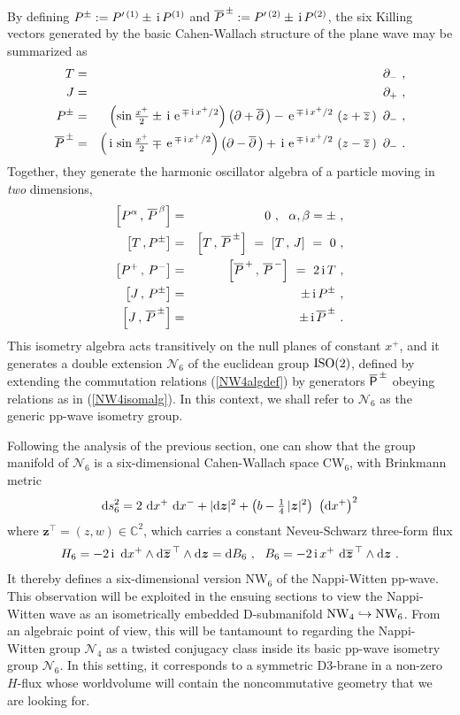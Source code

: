 \documentclass[11pt,a4paper]{article}
\newcommand{\ii}{{\rm i}}
\newcommand{\mbf}[1]{{\boldsymbol {#1} }}
\def\ii{{\,{\rm i}\,}}
\def\dd{{\rm d}}
\def\P{{\sf P}}
\def\J{{\sf J}}
\def\mz{{\mbf z}}
\newcommand{\complex}{{\mathbb C}} %
\def\nn{\nonumber}
\def\e{{\,\rm e}\,}
\def\bea{\begin{eqnarray}}
\def\eea{\end{eqnarray}}
\newcommand{\beq}{\begin{eqnarray}}
\newcommand{\eeq}{\end{eqnarray}}
\begin{document}
By defining $P^\pm:=P^{\prime\,(1)}\pm\ii P^{(1)}$ and
$\overline{P}^{\,\pm}:=P^{\prime\,(2)}\pm\ii P^{(2)}$, the six
Killing vectors generated by the basic Cahen-Wallach structure of the
plane wave may be summarized as
\bea
T&=&\partial_- \ , \nn\\J&=&\partial_+ \ , \nn\\
P^\pm&=&\left(\sin\mbox{$\frac{x^+}2$}\pm\ii\e^{\mp\ii x^+/2}\right)
\left(\partial+\overline{\partial}\,\right)-\e^{\mp\ii x^+/2}\,\left(
z+\overline{z}\,\right)~\partial_- \ , \nn
\\\overline{P}^{\,\pm}&=&\left(\ii\sin\mbox{$\frac{x^+}2$}\mp
\e^{\mp\ii x^+/2}\right)
\left(\partial-\overline{\partial}\,\right)+\ii\e^{\mp\ii x^+/2}\,\left(
z-\overline{z}\,\right)~\partial_- \ .
\label{6CWKilling}\eea
Together, they generate the harmonic oscillator algebra of a particle
moving in {\it two} dimensions,
\bea
\left[P^\alpha\,,\,\overline{P}^{\,\beta}\right]&=&0 \ , ~~
\alpha,\beta=\pm \ , \nn\\\left[T\,,P^\pm\right]&=&\left[T
\,,\,\overline{P}^{\,\pm}\right]~=~\left[T\,,\,J\right]~=~0 \ ,
\nn\\\left[P^+\,,\,P^-\right]&=&\left[\overline{P}^{\,+}\,,\,
\overline{P}^{\,-}\right]~=~2\ii T \ , \nn\\\left[J\,,\,
P^\pm\right]&=&\pm\ii P^\pm \ , \nn\\\left[J\,,\,\overline{P}^{\,
\pm}\right]&=&\pm\ii\overline{P}^{\,\pm} \ .
\label{NW4isomalg}\eea
This isometry algebra acts transitively on the null planes of constant
  $x^+$, and it generates a double extension ${\mathcal
  N}_6$ of the euclidean group ${\rm ISO}(2)$, defined by extending the
  commutation relations (\ref{NW4algdef}) by generators
  $\overline{\P}^{\,\pm}$ obeying relations as in (\ref{NW4isomalg}). In
  this context, we shall refer to $\mathcal N_6$ as the generic pp-wave
  isometry group.

Following the analysis of the previous section, one can show that the
group manifold of ${\mathcal N}_6$ is a six-dimensional Cahen-Wallach
space CW$_6$, with Brinkmann metric
\beq
\dd s_6^2=2~\dd x^+~\dd x^-+|\dd\mz|^2+\left(b-\mbox{$\frac14$}\,|\mz|^2\right)~
\left(\dd x^+\right)^2
\label{NW6metricBrink}\eeq
where $\mz^\top=(z,w)\in\complex^2$, which carries a constant
Neveu-Schwarz three-form flux
\beq
H_6=-2\ii~\dd x^+\wedge\dd\overline{\mz}^{\,\top}
\wedge\dd\mz=\dd B_6 \ , ~~
B_6=-2\ii x^+~\dd\overline{\mz}^{\,\top}\wedge\dd\mz \ .
\label{NW6Bfield}\eeq
It thereby defines a six-dimensional version NW$_6$ of the
Nappi-Witten pp-wave. This observation will be exploited in the
ensuing sections to view the Nappi-Witten wave as an isometrically
embedded D-submanifold ${\rm NW}_4\hookrightarrow{\rm NW}_6$. From an
algebraic point of view, this will be tantamount to regarding the
Nappi-Witten group $\mathcal N_4$ as a twisted conjugacy class inside
its basic pp-wave isometry group $\mathcal N_6$. In this
setting, it corresponds to a symmetric D3-brane in a non-zero $H$-flux
whose worldvolume will contain the noncommutative geometry that we are
looking for.
\end{document}
